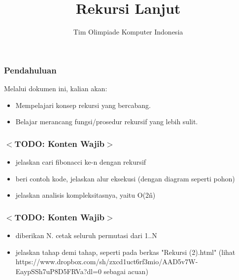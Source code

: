 

\title{Rekursi Lanjut}
\author{Tim Olimpiade Komputer Indonesia}
\date{}



\begin{frame}
\titlepage
\end{frame}

\begin{frame}
\frametitle{Pendahuluan}
Melalui dokumen ini, kalian akan:
\begin{itemize}
  \item Mempelajari konsep rekursi yang bercabang.
  \item Belajar merancang fungsi/prosedur rekursif yang lebih sulit.
\end{itemize}
\end{frame}

\begin{frame}
\frametitle{$<$TODO: Konten Wajib$>$}
\begin{itemize}
  \item jelaskan cari fibonacci ke-n dengan rekursif
  \item beri contoh kode, jelaskan alur eksekusi (dengan diagram seperti pohon)
  \item jelaskan analisis kompleksitasnya, yaitu O(2\^n)
\end{itemize}
\end{frame}

\begin{frame}
\frametitle{$<$TODO: Konten Wajib$>$}
\begin{itemize}
  \item diberikan N. cetak seluruh permutasi dari 1..N
  \item jelaskan tahap demi tahap, seperti pada berkas "Rekursi (2).html" (lihat  https://www.dropbox.com/sh/zxcd1uct6rf3mio/AAD5v7W-EaypSSh7uP8D5FRVa?dl=0 sebagai acuan)
\end{itemize}
\end{frame}


